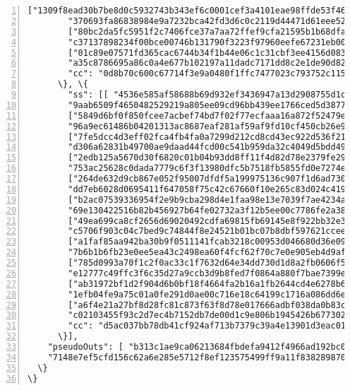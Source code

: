 \begin{appendices}
\begin{Verbatim}[commandchars=\\\{\}, numbers=left]
        ["1309f8ead30b7be8d0c5932743b343ef6c0001cef3a4101eae98ffde53f46300",
        "370693fa86838984e9a7232bca42fd3d6c0c2119d44471d61eee5233ba53c20f"],
        ["80bc2da5fc5951f2c7406fce37a7aa72ffef9cfa21595b1b68dfab4b7b9f9f0c",
        "c37137898234f00bce00746b131790f3223f97960eefe67231eb001092f5510c"],
        ["01c89e07571fd365cac6744b34f1b44e06c1c31cbf3ee4156d08309345fdb20e",
        "a35c8786695a86c0a4e677b102197a11dadc7171dd8c2e1de90d828f050ec00f"]], 
        "cc": "0d8b70c600c67714f3e9a0480f1ffc7477023c793752c1152d5df0813f75ff0f"
      \}, \{
        "ss": [[ "4536e585af58688b69d932ef3436947a13d2908755d1c644ca9d6a978f0f0206",
        "9aab6509f4650482529219a805ee09cd96bb439ee1766ced5d3877bf1518370b"],
        ["5849d6bf0f850fcee7acbef74bd7f02f77ecfaaa16a872f52479ebd27339760f",
        "96a9ec61486b04201313ac8687eaf281af59af9fd10cf450cb26e9dc8f1ce804"],
        ["7fe5dcc4d3eff02fca4fb4fa0a7299d212cd8cd43ec922d536f21f92c8f93f00",
        "d306a62831b49700ae9daad44fcd00c541b959da32c4049d5bdd49be28d96701"],
        ["2edb125a5670d30f6820c01b04b93dd8ff11f4d82d78e2379fe29d7a68d9c103",
        "753ac25628c0dada7779c6f3f13980dfc5b7518fb5855fd0e7274e3075a3410c"],
        ["264de632d9cb867e052f95007dfdf5a199975136c907f1d6ad73061938f49c01",
        "dd7eb6028d0695411f647058f75c42c67660f10e265c83d024c4199bed073d01"],
        ["b2ac07539336954f2e9b9cba298d4e1faa98e13e7039f7ae4234ac801641340f",
        "69e130422516b82b456927b64fe02732a3f12b5ee00c7786fe2a381325bf3004"],
        ["49ea699ca8cf2656d69020492cdfa69815fb69145e8f922bb32e358c23cebb0f",
        "c5706f903c04c7bed9c74844f8e24521b01bc07b8dbf597621cceeeb3afc1d0c"],
        ["a1faf85aa942ba30b9f0511141fcab3218c00953d046680d36e09c35c04be905",
        "7b6b1b6fb23e0ee5ea43c2498ea60f4fcf62f70c7e0e905eb4d9afa1d0a18800"],
        ["785d0993a70f1c2f0ac33c1f7632d64e34dd730d1d8a2fb0606f5770ed633506",
        "e12777c49ffc3f6c35d27a9ccb3d9b8fed7f0864a880f7bae7399e334207280e"],
        ["ab31972bf1d2f904d6b0bf18f4664fa2b16a1fb2644cd4e6278b63ade87b6d09",
        "1efb04fe9a75c01a0fe291d0ae00c716e18c64199c1716a086dd6e32f63e0a07"],
        ["a6f4e21a27bf8d28fc81c873f63f8d78e017666adbf038da0b83c2ad04ef6805",
        "c02103455f93c2d7ec4b7152db7de00d1c9e806b1945426b6773026b4a85dd03"]], 
        "cc": "d5ac037bb78db41cf924af713b7379c39a4e13901d3eac017238550a1a3b910a"
      \}],
    "pseudoOuts": [ "b313c1ae9ca06213684fbdefa9412f4966ad192bc0b2f74ed1731381adb7ab58",
    "7148e7ef5cfd156c62a6e285e5712f8ef123575499ff9a11f838289870522423"]
  \}
\}
\end{Verbatim}




\end{appendices}
